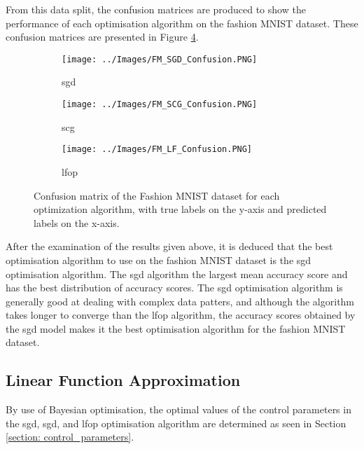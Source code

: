 \documentclass[10pt, conference]{IEEEtran}
\begin{document}
From this data split, the confusion matrices are produced to show the performance of each optimisation
algorithm on the fashion MNIST dataset. These confusion matrices are presented in Figure \ref{fig:FM_Classification}.
\begin{figure}[h!]
    \centering
    \begin{subfigure}[b]{0.23\textwidth}
        \centering
        \texttt{[image: ../Images/FM\_SGD\_Confusion.PNG]}
        \caption{\acrshort{sgd}}
        \label{fig:FM_SGD_Classification}
    \end{subfigure}
    \hfill
    \begin{subfigure}[b]{0.23\textwidth}
        \centering
        \texttt{[image: ../Images/FM\_SCG\_Confusion.PNG]}
        \caption{\acrshort{scg}}
        \label{fig:FM_SCG_Classification}
    \end{subfigure}
    \begin{subfigure}[b]{0.23\textwidth}
        \centering
        \texttt{[image: ../Images/FM\_LF\_Confusion.PNG]}
        \caption{\acrshort{lfop}}
        \label{fig:FM_LF_Classification}
    \end{subfigure}
    \caption{Confusion matrix of the Fashion MNIST dataset for each optimization algorithm, with true labels on the y-axis and predicted labels on the x-axis.}
    \label{fig:FM_Classification}
\end{figure}

After the examination of the results given above, it is deduced that the best optimisation algorithm
to use on the fashion MNIST dataset is the \acrshort{sgd} optimisation algorithm. The \acrshort{sgd}
algorithm the largest mean accuracy score and has the best distribution of accuracy scores. The \acrshort{sgd}
optimisation algorithm is generally good at dealing with complex data patters, and although the algorithm
takes longer to converge than the \acrshort{lfop} algorithm, the accuracy scores obtained by the \acrshort{sgd}
model makes it the best optimisation algorithm for the fashion MNIST dataset.

\subsection{Linear Function Approximation}

By use of Bayesian optimisation, the optimal values of the control parameters in the
\acrshort{sgd}, \acrshort{sgd}, and \acrshort{lfop} optimisation algorithm are determined as seen in
Section \ref{section: control_parameters}.
\end{document}
